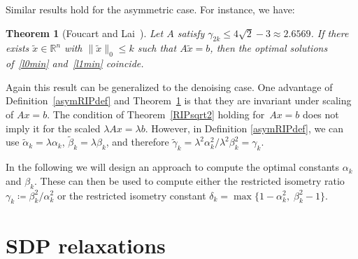 \documentclass[journal]{IEEEtran}
\newtheorem{theorem}{Theorem}
\newcommand{\define}{\coloneqq}
\newcommand{\Norm}[2]{\lVert{#1}\rVert_{#2}}
\newcommand{\R}{\mathds{R}}
\begin{document}
Similar results hold for the asymmetric case. For instance, we have:

\begin{theorem}[Foucart and Lai~\cite{FL09}]\label{asymRIPtheorem}
  Let $A$ satisfy $\gamma_{2k} \leq 4 \sqrt{2} - 3 \approx 2.6569$. If
  there exists $\tilde{x} \in \R^n$ with $\Norm{\tilde{x}}{0} \leq k$ such
  that $A\tilde{x} = b$, then the optimal solutions of~\eqref{l0min}
  and~\eqref{l1min} coincide.
\end{theorem}

Again this result can be generalized to the denoising case. One advantage
of Definition~\ref{asymRIPdef} and Theorem~\ref{asymRIPtheorem} is that they
are invariant under scaling of $Ax = b$. The condition of
Theorem~\ref{RIPsqrt2} holding for~$A x = b$ does not imply it for the scaled
$\lambda Ax = \lambda b$. However, in Definition \ref{asymRIPdef}, we can
use $\tilde{\alpha}_k = \lambda \alpha_k$, $\tilde{\beta}_k = \lambda
\beta_k$, and therefore $\tilde{\gamma}_k = \lambda^2 \alpha_k^2 /
\lambda^2 \beta_k^2 = \gamma_k$.

In the following we will design an approach to compute the optimal
constants $\alpha_k$ and $\beta_k$. These can then be used to compute
either the restricted isometry ratio $\gamma_k \define \beta_k^2 / \alpha_k^2$
or the restricted isometry constant $\delta_k = \max \{ 1 - \alpha_k^2,\;
\beta_k^2 - 1 \}$.

\section{SDP relaxations}
\label{sec:SDPrelax}
\end{document}
